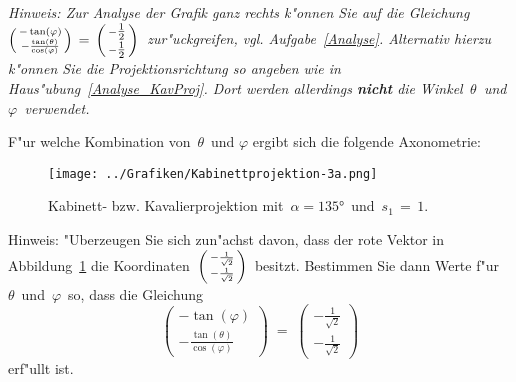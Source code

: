 \begin{Aufgabe}
\textit{Hinweis: Zur Analyse der Grafik ganz rechts k"onnen Sie auf die Gleichung\,  $\begin{psmallmatrix} - \tan(\varphi) \\ - \frac{\tan(\theta)}{\cos(\varphi)} \end{psmallmatrix}\, =\, \begin{psmallmatrix} -\tfrac{1}{2}\\ -\tfrac{1}{2}\end{psmallmatrix}$\, zur"uckgreifen, vgl. Aufgabe~\ref{Analyse}. Alternativ hierzu k"onnen Sie die Projektionsrichtung so angeben wie in Haus"ubung~\ref{Analyse_KavProj}. Dort werden allerdings \textbf{nicht} die Winkel\, $\theta$\, und\, $\varphi$\, verwendet.}
\begin{Teilaufgaben}
\item F"ur welche Kombination von\, $\theta$\, und  $\varphi$ ergibt sich die folgende Axonometrie:
 \begin{figure}[ht]
  \centering
  \texttt{[image: ../Grafiken/Kabinettprojektion-3a.png]}
  \caption{Kabinett- bzw. Kavalierprojektion mit\, $\alpha = \ang{135}$\, und \,$s_1\, =\,1$.}
  \label{KabinettprojTut}
  \end{figure}

  Hinweis: "Uberzeugen Sie sich zun"achst davon, dass der rote Vektor in Abbildung~\ref{KabinettprojTut} die Koordinaten\, $\begin{psmallmatrix} - \frac{1}{\sqrt{2}}\\ - \frac{1}{\sqrt{2}} \end{psmallmatrix}$\, besitzt. Bestimmen Sie dann Werte f"ur\, $\theta$\, und\, $\varphi$\, so, dass die Gleichung \[\begin{pmatrix} - \tan(\varphi) \\ - \frac{\tan(\theta)}{\cos(\varphi)} \end{pmatrix}\;=\;\begin{pmatrix} - \frac{1}{\sqrt{2}}\\ - \frac{1}{\sqrt{2}} \end{pmatrix}\] erf"ullt ist.
\end{Teilaufgaben}
\end{Aufgabe}
